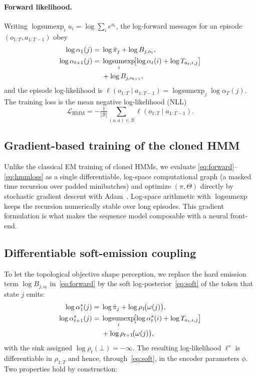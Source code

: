 \documentclass[twocolumn,10pt]{article}
\DeclareMathOperator*{\lse}{logsumexp}
\newcommand{\Lcal}{\mathcal{L}}
\begin{document}
\paragraph{Forward likelihood.}
Writing $\lse_i u_i=\log\sum_i e^{u_i}$, the log-forward messages for an
episode $(o_{1:T},a_{1:T-1})$ obey
\begin{align}
\log\alpha_1(j) ={}& \log\bar\pi_j+\log B_{j,o_1},\\
\log\alpha_{t+1}(j) ={}& \lse_{i}\!\bigl[\log\alpha_t(i)+\log T_{a_t,i,j}\bigr]
                       \notag\\
   &{}+ \log B_{j,o_{t+1}},
\label{eq:forward}
\end{align}
and the episode log-likelihood is
$\ell(o_{1:T}\!\mid a_{1:T-1})=\lse_{j}\log\alpha_T(j)$. The training loss is
the mean negative log-likelihood (NLL)
\begin{equation}
\Lcal_{\mathrm{HMM}}=-\tfrac{1}{|\mathcal{B}|}
  \textstyle\sum_{(o,a)\in\mathcal{B}}\ell(o_{1:T}\mid a_{1:T-1}).
\label{eq:hmmloss}
\end{equation}

\subsection{Gradient-based training of the cloned HMM}
\label{sec:grad}

Unlike the classical EM training of cloned HMMs, we evaluate
\eqref{eq:forward}--\eqref{eq:hmmloss} as a single differentiable, log-space
computational graph (a masked time recursion over padded minibatches) and
optimize $(\pi,\Theta)$ directly by stochastic gradient descent with
Adam~\cite{kingma2015}. Log-space arithmetic with $\lse$ keeps the recursion
numerically stable over long episodes. This gradient formulation is what makes
the sequence model composable with a neural front-end.

\subsection{Differentiable soft-emission coupling}
\label{sec:soft}

To let the topological objective shape perception, we replace the hard
emission term $\log B_{j,o_{t}}$ in~\eqref{eq:forward} by the soft
log-posterior~\eqref{eq:soft} of the token that state $j$ emits:
\begin{align}
\log\alpha^{s}_1(j) ={}& \log\bar\pi_j+\log\rho_1\!\bigl(\omega(j)\bigr),\\
\log\alpha^{s}_{t+1}(j) ={}& \lse_{i}\!\bigl[\log\alpha^{s}_t(i)+\log T_{a_t,i,j}\bigr]
   \notag\\
   &{}+ \log\rho_{t+1}\!\bigl(\omega(j)\bigr),
\label{eq:softforward}
\end{align}
with the sink assigned $\log\rho_t(\bot)=-\infty$. The resulting
log-likelihood $\ell^{s}$ is differentiable in $\rho_{1:T}$ and hence,
through~\eqref{eq:soft}, in the encoder parameters $\phi$. Two properties hold
by construction:
\end{document}
